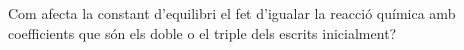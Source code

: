 \begin{exr}{}
Com afecta la constant d'equilibri el fet d'igualar la reacció química amb coefficients que són els doble o el triple dels escrits inicialment?
\end{exr}
